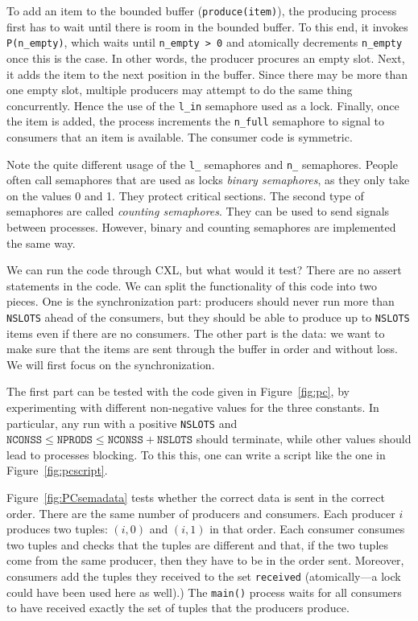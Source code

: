 \documentclass{report}
\begin{document}
To add an item to the bounded buffer (\texttt{produce(item)}), the producing
process first has to wait until there is room in the bounded buffer.
To this end, it invokes \texttt{P(n\_empty)}, which waits until
\texttt{n\_empty > 0} and atomically decrements \texttt{n\_empty} once this
is the case.  In other words, the producer procures an empty slot.
Next, it adds the item to the next position in the buffer.
Since there may be more than one empty slot, multiple producers may attempt
to do the same thing concurrently.  Hence the use of the \texttt{l\_in}
semaphore used as a lock.  Finally, once the item is added, the process
increments the \texttt{n\_full} semaphore to signal to consumers that
an item is available.
The consumer code is symmetric.

Note the quite different usage of the \texttt{l\_} semaphores and \texttt{n\_}
semaphores.
People often call semaphores that are used as locks \emph{binary semaphores},
as they only take on the values 0 and 1.
They protect critical sections.
The second type of semaphores are called \emph{counting semaphores}.
They can be used to send signals between processes.
However, binary and counting semaphores are implemented the same way.

We can run the code through CXL, but what would it test?  There are no
assert statements in the code.
We can split the functionality of this code into two pieces.  One is
the synchronization part: producers should never run more than \texttt{NSLOTS}
ahead of the consumers, but they should be able to produce up to \texttt{NSLOTS}
items even if there are no consumers.  The other part is the data: we want
to make sure that the items are sent through the buffer in order and without
loss.  We will first focus on the synchronization.

The first part can be tested with the code given in Figure~\ref{fig:pc}, by
experimenting with different non-negative values for the three constants.
In particular, any run with a positive \texttt{NSLOTS} and
$\mathtt{NCONSS} \le \mathtt{NPRODS} \le \mathtt{NCONSS} + \mathtt{NSLOTS}$
should terminate, while other values should lead to processes blocking.
To this this, one can write a script like the one in Figure~\ref{fig:pcscript}.

Figure~\ref{fig:PCsemadata} tests whether the correct data is sent in
the correct order.  There are the same number of producers and consumers.
Each producer $i$ produces two tuples: $(i, 0)$ and $(i, 1)$ in that order.
Each consumer consumes two tuples and checks that the tuples are different
and that, if the two tuples come from the same producer, then they have to
be in the order sent.
Moreover, consumers add the tuples they received to the set
\texttt{received} (atomically---a lock could have been used here as well).)
The \texttt{main()} process waits for all consumers to have received
exactly the set of tuples that the producers produce.
\end{document}
